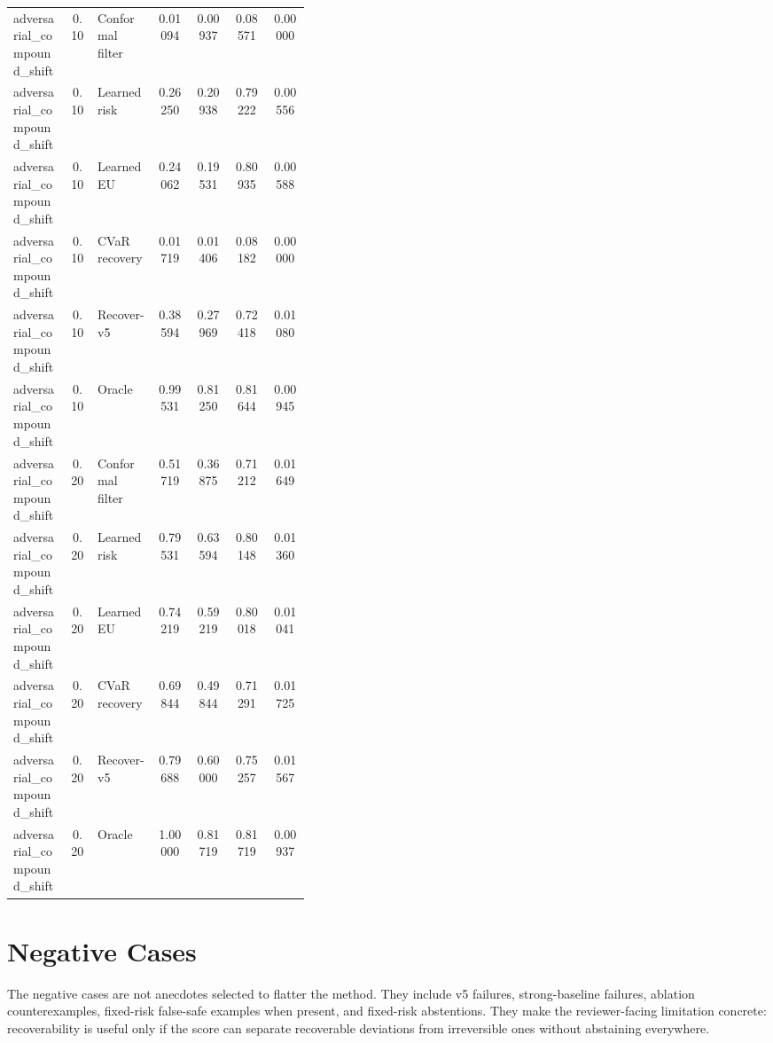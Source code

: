 \documentclass{article}
\begin{document}
\begin{center}
\begin{longtable}{p{0.19\linewidth}cp{0.20\linewidth}cccc}
adversarial\_compound\_shift & 0.10 & Conformal filter & 0.01094 & 0.00937 & 0.08571 & 0.00000\\
adversarial\_compound\_shift & 0.10 & Learned risk & 0.26250 & 0.20938 & 0.79222 & 0.00556\\
adversarial\_compound\_shift & 0.10 & Learned EU & 0.24062 & 0.19531 & 0.80935 & 0.00588\\
adversarial\_compound\_shift & 0.10 & CVaR recovery & 0.01719 & 0.01406 & 0.08182 & 0.00000\\
adversarial\_compound\_shift & 0.10 & Recover-v5 & 0.38594 & 0.27969 & 0.72418 & 0.01080\\
adversarial\_compound\_shift & 0.10 & Oracle & 0.99531 & 0.81250 & 0.81644 & 0.00945\\
adversarial\_compound\_shift & 0.20 & Conformal filter & 0.51719 & 0.36875 & 0.71212 & 0.01649\\
adversarial\_compound\_shift & 0.20 & Learned risk & 0.79531 & 0.63594 & 0.80148 & 0.01360\\
adversarial\_compound\_shift & 0.20 & Learned EU & 0.74219 & 0.59219 & 0.80018 & 0.01041\\
adversarial\_compound\_shift & 0.20 & CVaR recovery & 0.69844 & 0.49844 & 0.71291 & 0.01725\\
adversarial\_compound\_shift & 0.20 & Recover-v5 & 0.79688 & 0.60000 & 0.75257 & 0.01567\\
adversarial\_compound\_shift & 0.20 & Oracle & 1.00000 & 0.81719 & 0.81719 & 0.00937\\
\bottomrule
\end{longtable}
\normalsize
\end{center}

\section{Negative Cases}

The negative cases are not anecdotes selected to flatter the method. They include v5 failures, strong-baseline failures, ablation counterexamples, fixed-risk false-safe examples when present, and fixed-risk abstentions. They make the reviewer-facing limitation concrete: recoverability is useful only if the score can separate recoverable deviations from irreversible ones without abstaining everywhere.
\end{document}
